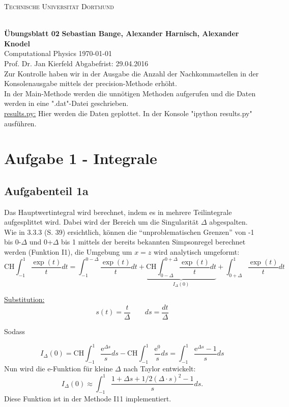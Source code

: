 
\usepackage{hyperref}

\noindent
\centerline{\small{\textsc{Technische Universität Dortmund}}} \\
\large\textbf{Übungsblatt 02} \hfill \footnotesize\textbf{Sebastian Bange, Alexander Harnisch, Alexander Knodel} \\
\normalsize Computational Physics \hfill \today \\
Prof. Dr. Jan Kierfeld \hfill Abgabefrist: 29.04.2016\\
\noindent\makebox[\linewidth]{\rule{\textwidth}{0.4pt}}
Zur Kontrolle haben wir in der Ausgabe die Anzahl der Nachkommastellen in der Konsolenausgabe mittels der precision-Methode erhöht.\\
In der Main-Methode werden die unnötigen Methoden aufgerufen und die Daten werden in eine ".dat"-Datei geschrieben. \\
\underline{results.py:}
Hier werden die Daten geplottet. In der Konsole "ipython results.py" ausführen.
\section*{Aufgabe 1 - Integrale}
\subsection*{Aufgabenteil 1a}
Das Hauptwertintegral wird berechnet, indem es in mehrere Teilintegrale aufgesplittet wird. Dabei wird der Bereich um die Singularität $\Delta$ abgespalten. Wie in 3.3.3 (S. 39) ersichtlich, können die \enquote{unproblematischen Grenzen} von -1 bis 0-$\Delta$ und 0+$\Delta$ bis 1 mittels der bereits bekannten Simpsonregel berechnet werden (Funktion I1), die Umgebung um $x = z$ wird analytisch umgeformt:
\begin{equation*}
\text{CH} \int_{-1}^{1} \frac{\exp(t)}{t} dt = \int_{-1}^{0-\Delta}\frac{\exp(t)}{t}dt+\underbrace{\text{CH}\int_{0-\Delta}^{0+\Delta}\frac{\exp(t)}{t}dt}_{I_{\Delta}(0)}+\int_{0+\Delta}^1\frac{\exp(t)}{t}dt
\end{equation*}

\underline{Substitution:}
\begin{equation*}
s(t) = \frac{t}{\Delta} \qquad ds = \frac{dt}{\Delta}
\end{equation*}

Sodass

\begin{equation*}
I_{\Delta}(0) = \text{CH} \int_{-1}^{1} \frac{\mathup{e}^{\Delta s}}{s} ds - \text{CH} \int_{-1}^1 \frac{\mathup{e}^0}{s} ds = \int_{-1}^{1} \frac{\mathup{e}^{\Delta s}-1}{s} ds
\end{equation*}
Nun wird die e-Funktion für kleine $\Delta$ nach Taylor entwickelt:
\begin{equation*}
I_{\Delta}(0) \approx \int_{-1}^{1} \frac{1+\Delta s + 1/2 \left(\Delta \cdot s\right)^2 -1}{s} ds.
\end{equation*}
Diese Funktion ist in der Methode I11 implementiert.


